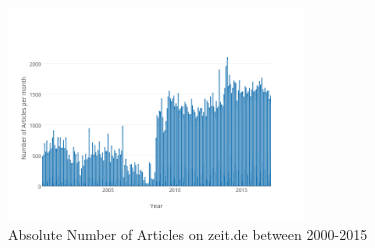 \begin{figure}[h]
  \centering
  \includegraphics[width=0.7\textwidth]{images/zeit/total_number_of_articles}
  \caption{Absolute Number of Articles on zeit.de between 2000-2015}
  \label{fig:zeit_total_number_of_articles}
\end{figure}
